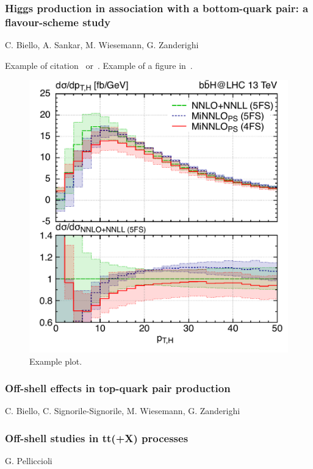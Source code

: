 \documentclass{FBR_Bericht_2025}
\begin{document}
\begin{refsection}
\subsubsection{Higgs production in association with a bottom-quark pair: a flavour-scheme study}
\begin{Namen}
C. Biello, A. Sankar, M. Wiesemann, G. Zanderighi
\end{Namen}
Example of citation~\cite{Biello:2024pgo} or~.
Example of a figure in~.
\begin{figure}[phtb]
\begin{center}
\includegraphics[width=0.95\linewidth]{plots/bbH__ptHspectrum.pdf}
\caption{Example plot.}
\label{fig:bbH}
\end{center}
\end{figure}
%
\subsubsection{Off-shell effects in top-quark pair production}
\begin{Namen}
C. Biello, C. Signorile-Signorile, M. Wiesemann, G. Zanderighi
\end{Namen}
%
\subsubsection{Off-shell studies in tt(+X) processes}
\begin{Namen}
G. Pelliccioli
\end{Namen}
%

\end{refsection}
\end{document}
